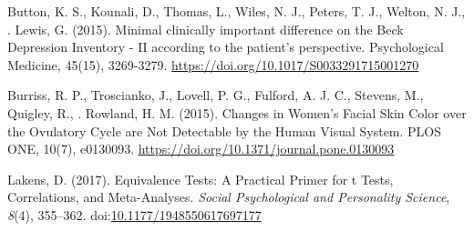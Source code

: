 \documentclass[english,man]{apa6}
\theoremstyle{definition}
\theoremstyle{definition}
\theoremstyle{definition}
\theoremstyle{remark}
\begin{document}
Button, K. S., Kounali, D., Thomas, L., Wiles, N. J., Peters, T. J.,
Welton, N. J., . Lewis, G. (2015). Minimal clinically important
difference on the Beck Depression Inventory - II according to the
patient's perspective. Psychological Medicine, 45(15), 3269-3279.
\url{https://doi.org/10.1017/S0033291715001270}

Burriss, R. P., Troscianko, J., Lovell, P. G., Fulford, A. J. C.,
Stevens, M., Quigley, R., . Rowland, H. M. (2015). Changes in Women's
Facial Skin Color over the Ovulatory Cycle are Not Detectable by the
Human Visual System. PLOS ONE, 10(7), e0130093.
\url{https://doi.org/10.1371/journal.pone.0130093}

\setlength{\parindent}{-0.5in} \setlength{\leftskip}{0.5in}

\hypertarget{refs}{}
\hypertarget{ref-lakens_equivalence_2017}{}
Lakens, D. (2017). Equivalence Tests: A Practical Primer for t Tests,
Correlations, and Meta-Analyses. \emph{Social Psychological and
Personality Science}, \emph{8}(4), 355--362.
doi:\href{https://doi.org/10.1177/1948550617697177}{10.1177/1948550617697177}
\end{document}
